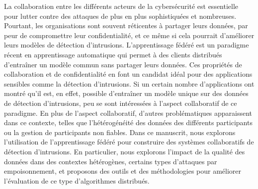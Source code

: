 La collaboration entre les différents acteurs de la cybersécurité est essentielle pour lutter contre des attaques de plus en plus sophistiquées et nombreuses.
Pourtant, les organisations sont souvent réticentes à partager leurs données, par peur de compromettre leur confidentialité, et ce même si cela pourrait d'améliorer leurs modèles de détection d'intrusions.
L'apprentissage fédéré est un paradigme récent en apprentissage automatique qui permet à des clients distribués d'entraîner un modèle commun sans partager leurs données.
Ces propriétés de collaboration et de confidentialité en font un candidat idéal pour des applications sensibles comme la détection d'intrusions.
Si un certain nombre d'applications ont montré qu'il est, en effet, possible d'entraîner un modèle unique sur des données de détection d'intrusions, peu se sont intéressées à l'aspect collaboratif de ce paradigme.
En plus de l'aspect collaboratif, d'autres problématiques apparaissent dans ce contexte, telles que l'hétérogénéité des données des différents participants ou la gestion de participants non fiables.
%
Dans ce manuscrit, nous explorons l'utilisation de l'apprentissage fédéré pour construire des systèmes collaboratifs de détection d'intrusions.
En particulier, nous explorons l'impact de la qualité des données dans des contextes hétérogènes, certains types d'attaques par empoisonnement, et proposons des outils et des méthodologies pour améliorer l'évaluation de ce type d'algorithmes distribués.